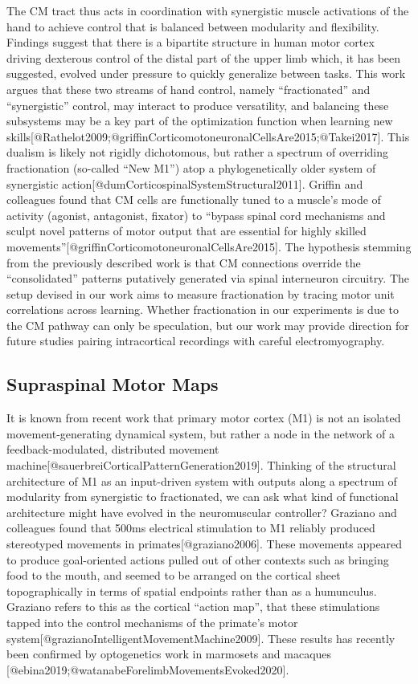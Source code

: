 The CM tract thus acts in coordination with synergistic muscle
activations of the hand to achieve control that is balanced between
modularity and flexibility. Findings suggest that there is a bipartite
structure in human motor cortex driving dexterous control of the distal
part of the upper limb which, it has been suggested, evolved under
pressure to quickly generalize between tasks. This work argues that
these two streams of hand control, namely ``fractionated'' and
``synergistic'' control, may interact to produce versatility, and
balancing these subsystems may be a key part of the optimization
function when learning new
skills{[}@Rathelot2009;@griffinCorticomotoneuronalCellsAre2015;@Takei2017{]}.
This dualism is likely not rigidly dichotomous, but rather a spectrum of
overriding fractionation (so-called ``New M1'') atop a phylogenetically
older system of synergistic
action{[}@dumCorticospinalSystemStructural2011{]}. Griffin and
colleagues found that CM cells are functionally tuned to a muscle's mode
of activity (agonist, antagonist, fixator) to ``bypass spinal cord
mechanisms and sculpt novel patterns of motor output that are essential
for highly skilled
movements''{[}@griffinCorticomotoneuronalCellsAre2015{]}. The hypothesis
stemming from the previously described work is that CM connections
override the ``consolidated'' patterns putatively generated via spinal
interneuron circuitry. The setup devised in our work aims to measure
fractionation by tracing motor unit correlations across learning.
Whether fractionation in our experiments is due to the CM pathway can
only be speculation, but our work may provide direction for future
studies pairing intracortical recordings with careful electromyography.

\subsection{Supraspinal Motor Maps}\label{supraspinal-motor-maps}

It is known from recent work that primary motor cortex (M1) is not an
isolated movement-generating dynamical system, but rather a node in the
network of a feedback-modulated, distributed movement
machine{[}@sauerbreiCorticalPatternGeneration2019{]}. Thinking of the
structural architecture of M1 as an input-driven system with outputs
along a spectrum of modularity from synergistic to fractionated, we can
ask what kind of functional architecture might have evolved in the
neuromuscular controller? Graziano and colleagues found that 500ms
electrical stimulation to M1 reliably produced stereotyped movements in
primates{[}@graziano2006{]}. These movements appeared to produce
goal-oriented actions pulled out of other contexts such as bringing food
to the mouth, and seemed to be arranged on the cortical sheet
topographically in terms of spatial endpoints rather than as a
humunculus. Graziano refers to this as the cortical ``action map'', that
these stimulations tapped into the control mechanisms of the primate's
motor system{[}@grazianoIntelligentMovementMachine2009{]}. These results
has recently been confirmed by optogenetics work in marmosets and
macaques {[}@ebina2019;@watanabeForelimbMovementsEvoked2020{]}.


